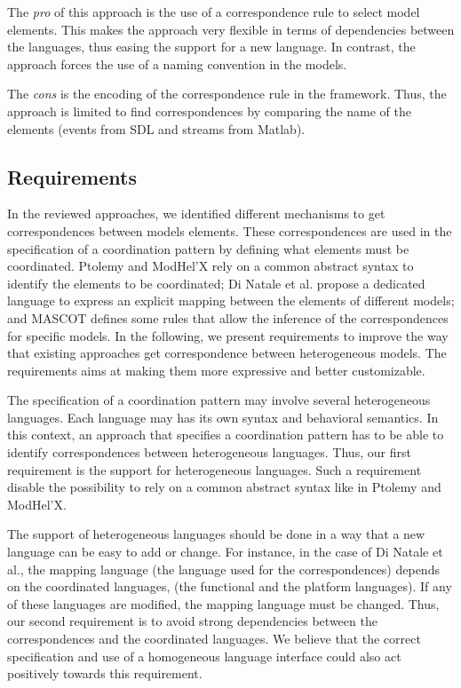The \emph{pro} of this approach is the use of a correspondence rule to select model elements. This makes the approach very flexible in terms of dependencies between the languages, thus easing the support for a new language. In contrast, the approach forces the use of a naming convention in the models.     

The \emph{cons} is the encoding of the correspondence rule in the framework. Thus, the approach is limited to find correspondences by comparing the name of the elements (\ie events from SDL and streams from Matlab).



\subsection{Requirements}

In the reviewed approaches, we identified different mechanisms to get correspondences between models elements. These correspondences are used in the specification of a coordination pattern by defining what elements must be coordinated. Ptolemy and ModHel'X rely on a common abstract syntax to identify the elements to be coordinated; Di Natale et al. propose a dedicated language to express an explicit mapping between the elements of different models; and MASCOT defines some rules that allow the inference of the correspondences for specific models. In the following, we present requirements to improve the way that existing approaches get correspondence between heterogeneous models. The requirements aims at making them more expressive and better customizable.  


The specification of a coordination pattern may involve several heterogeneous languages. Each language may has its own syntax and behavioral semantics. In this context, an approach that specifies a coordination pattern has to be able to identify correspondences between heterogeneous languages. Thus, our first requirement is the support for heterogeneous languages. Such a requirement disable the possibility to rely on a common abstract syntax like in Ptolemy and ModHel'X.

The support of heterogeneous languages should be done in a way that a new language can be easy to add or change. For instance, in the case of Di Natale et al., the mapping language (\ie the language used for the correspondences) depends on the coordinated languages, (\ie the functional and the platform languages). If any of these languages are modified, the mapping language must be changed. Thus, our second requirement is to avoid strong dependencies between the correspondences and the coordinated languages. We believe that the correct specification and use of a homogeneous language interface could also act positively towards this requirement. 

